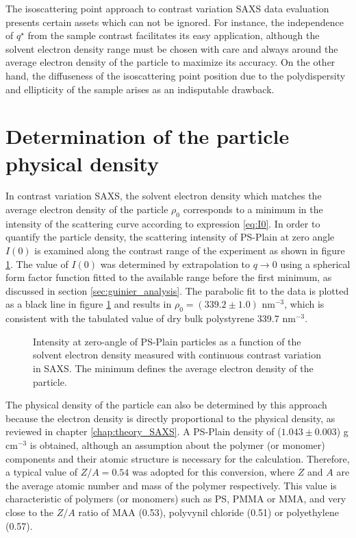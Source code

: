 The isoscattering point approach to contrast variation SAXS data evaluation presents certain assets which can not be ignored. For instance, the independence of $q^{\star}$ from the sample contrast facilitates its easy application, although the solvent electron density range must be chosen with care and always around the average electron density of the particle to maximize its accuracy. On the other hand, the diffuseness of the isoscattering point position due to the polydispersity and ellipticity of the sample arises as an indisputable drawback.

\section{Determination of the particle physical density}
\label{sec:physical_density}
In contrast variation SAXS, the solvent electron density which matches the average electron density of the particle $\rho_0$ corresponds to a minimum in the intensity of the scattering curve  according to expression \ref{eq:I0}. In order to quantify the particle density, the scattering intensity of PS-Plain at zero angle $I(0)$ is examined along the contrast range of the experiment as shown in figure \ref{fig:PSPlainAverageDensity}. The value of $I(0)$ was determined by extrapolation to $q\rightarrow 0$ using a spherical form factor function fitted to the available range before the first minimum, as discussed in section \ref{sec:guinier_analysis}. The parabolic fit to the data is plotted as a black line in figure \ref{fig:PSPlainAverageDensity} and results in $\rho_0=\left(339.2\pm1.0\right)$ nm$^{-3}$, which is consistent with the tabulated value of dry bulk polystyrene 339.7 nm$^{-3}$\citep{dingenouts_analysis_1999}.


\begin{figure}
	\begin{center}
		
	\end{center}
	\caption[Zero-angle intensity of the PS-Plain particles.]{Intensity at zero-angle of PS-Plain particles as a function of the solvent electron density measured with continuous contrast variation in SAXS. The minimum defines the average electron density of the particle.}
	\label{fig:PSPlainAverageDensity}
\end{figure}

The physical density of the particle can also be determined by this approach because the electron density is directly proportional to the physical density, as reviewed in chapter \ref{chap:theory_SAXS}. A PS-Plain density of ($1.043\pm0.003$) g cm$^{-3}$ is obtained, although an assumption about the polymer (or monomer) components and their atomic structure is necessary for the calculation. Therefore, a typical value of $Z/A=0.54$ was adopted for this conversion, where $Z$ and $A$ are the average atomic number and mass of the polymer respectively. This value is characteristic of polymers (or monomers) such as PS, PMMA or MMA, and very close to the $Z/A$ ratio of MAA (0.53), polyvynil chloride (0.51) or polyethylene (0.57).

